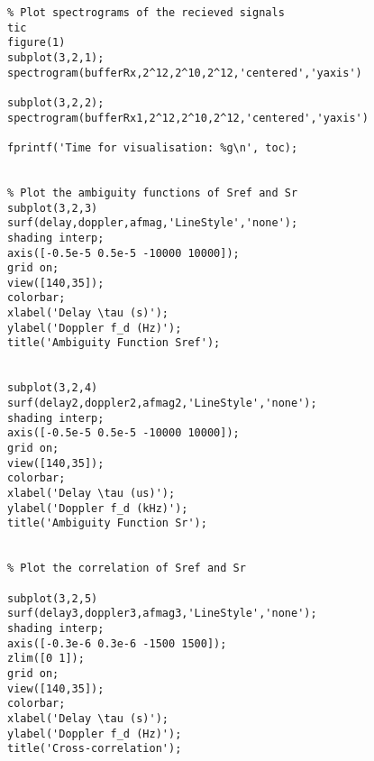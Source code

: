 \begin{verbatim}
% Plot spectrograms of the recieved signals
tic
figure(1)
subplot(3,2,1);
spectrogram(bufferRx,2^12,2^10,2^12,'centered','yaxis')

subplot(3,2,2);
spectrogram(bufferRx1,2^12,2^10,2^12,'centered','yaxis')

fprintf('Time for visualisation: %g\n', toc);


% Plot the ambiguity functions of Sref and Sr
subplot(3,2,3)
surf(delay,doppler,afmag,'LineStyle','none'); 
shading interp;
axis([-0.5e-5 0.5e-5 -10000 10000]); 
grid on; 
view([140,35]); 
colorbar;
xlabel('Delay \tau (s)');
ylabel('Doppler f_d (Hz)');
title('Ambiguity Function Sref');


subplot(3,2,4)   
surf(delay2,doppler2,afmag2,'LineStyle','none'); 
shading interp;
axis([-0.5e-5 0.5e-5 -10000 10000]); 
grid on; 
view([140,35]); 
colorbar;
xlabel('Delay \tau (us)');
ylabel('Doppler f_d (kHz)');
title('Ambiguity Function Sr');


% Plot the correlation of Sref and Sr

subplot(3,2,5)
surf(delay3,doppler3,afmag3,'LineStyle','none'); 
shading interp;
axis([-0.3e-6 0.3e-6 -1500 1500]); 
zlim([0 1]);
grid on; 
view([140,35]); 
colorbar;
xlabel('Delay \tau (s)');
ylabel('Doppler f_d (Hz)');
title('Cross-correlation');
\end{verbatim}
